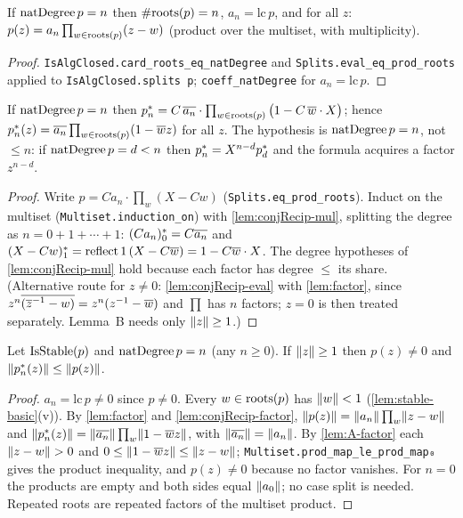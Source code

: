 \begin{lemma}\label{lem:factor}
If $\natdeg\,p=n$ then $\#\roots p=n$, $a_n=\mathrm{lc}\,p$, and for all $z$:
$p(z)=a_n\prod_{w\in\roots p}(z-w)$ (product over the multiset, with multiplicity).
\end{lemma}
\begin{proof}
\texttt{IsAlgClosed.card\_roots\_eq\_natDegree} and
\texttt{Splits.eval\_eq\_prod\_roots} applied to \texttt{IsAlgClosed.splits p};
\texttt{coeff\_natDegree} for $a_n=\mathrm{lc}\,p$.
\end{proof}

\begin{lemma}\label{lem:conjRecip-factor}
If $\natdeg\,p=n$ then
$\crec{n}{p}=C\,\cj{a_n}\cdot\prod_{w\in\roots p}\big(1-C\,\cj w\cdot X\big)$;
hence $\crec{n}{p}(z)=\cj{a_n}\prod_{w\in\roots p}(1-\cj w z)$ for all $z$.
The hypothesis is $\natdeg\,p=n$, not $\le n$: if $\natdeg\,p=d<n$ then
$\crec np=X^{n-d}\crec dp$ and the formula acquires a factor $z^{n-d}$.
\end{lemma}
\begin{proof}
Write $p=C a_n\cdot\prod_{w}(X-Cw)$ (\texttt{Splits.eq\_prod\_roots}). Induct on
the multiset (\texttt{Multiset.induction\_on}) with \ref{lem:conjRecip-mul},
splitting the degree as $n=0+1+\cdots+1$: $\crec{0}{(Ca_n)}=C\cj{a_n}$ and
$\crec{1}{(X-Cw)}=\mathrm{reflect}\,1\,(X-C\cj w)=1-C\cj w\cdot X$. The degree
hypotheses of \ref{lem:conjRecip-mul} hold because each factor has degree
$\le$ its share. (Alternative route for $z\ne0$: \ref{lem:conjRecip-eval} with
\ref{lem:factor}, since $z^n\cj{(\cj z^{-1}-w)}=z^n(z^{-1}-\cj w)$ and
$\prod$ has $n$ factors; $z=0$ is then treated separately. Lemma~B needs only
$\nm z\ge1$.)
\end{proof}

\begin{lemma}\label{lem:B}
Let $\stable(p)$ and $\natdeg\,p=n$ (any $n\ge0$). If $\nm z\ge1$ then
$p(z)\ne0$ and $\nm{\crec{n}{p}(z)}\le\nm{p(z)}$.
\end{lemma}
\begin{proof}
$a_n=\mathrm{lc}\,p\ne0$ since $p\ne0$. Every $w\in\roots p$ has $\nm w<1$
(\ref{lem:stable-basic}(v)). By \ref{lem:factor} and \ref{lem:conjRecip-factor},
$\nm{p(z)}=\nm{a_n}\prod_w\nm{z-w}$ and
$\nm{\crec np(z)}=\nm{\cj{a_n}}\prod_w\nm{1-\cj wz}$, with
$\nm{\cj{a_n}}=\nm{a_n}$. By \ref{lem:A-factor} each $\nm{z-w}>0$ and
$0\le\nm{1-\cj wz}\le\nm{z-w}$; \texttt{Multiset.prod\_map\_le\_prod\_map₀}
gives the product inequality, and $p(z)\ne0$ because no factor vanishes. For
$n=0$ the products are empty and both sides equal $\nm{a_0}$; no case split is
needed. Repeated roots are repeated factors of the multiset product.
\end{proof}

